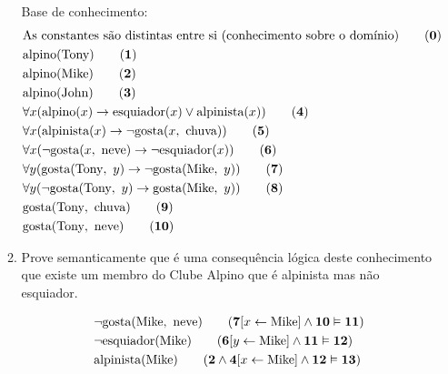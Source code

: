 \documentclass[10pt, twoside]{article}          %
\let\oldphantom\vphantom
\let\vphantom\relax
\let\vphantom\oldphantom
\renewcommand{\l}{\mathopen{}\left}             %
\renewcommand{\r}{\vphantom{1j}\right}          %
\newenvironment{proof*}[1][proof*]              %
  {\proof[#1]\vspace{0.5em}\vspace*{-\baselineskip}
  \hspace{\parindent}\leftskip=.5cm\rightskip=.5cm}
  {\vspace*{-1.5\baselineskip}
  
  \rightskip=0cm\endproof}
\begin{document}
\begin{multicols*}{2}
\begin{enumerate}
\begin{proof*}[\unskip\nopunct]
\begin{enumerate}
        Base de conhecimento:
        \begin{align*}
          & \text{As constantes são distintas entre si (conhecimento sobre o domínio)}              \tag{\textbf{0}}   \\
          & \text{alpino}(\text{Tony})                                                              \tag{\textbf{1}}   \\
          & \text{alpino}(\text{Mike})                                                              \tag{\textbf{2}}   \\
          & \text{alpino}(\text{John})                                                              \tag{\textbf{3}}   \\
          & \forall x(\text{alpino}(x)\rightarrow\text{esquiador}(x)\lor\text{alpinista}(x))        \tag{\textbf{4}}   \\
          & \forall x(\text{alpinista}(x)\rightarrow\lnot\text{gosta}(x,\ \text{chuva}))            \tag{\textbf{5}}   \\
          & \forall x(\lnot\text{gosta}(x,\ \text{neve})\rightarrow\lnot\text{esquiador}(x))        \tag{\textbf{6}}   \\
          & \forall y(\text{gosta}(\text{Tony},\ y)\rightarrow\lnot\text{gosta}(\text{Mike},\ y))   \tag{\textbf{7}}   \\
          & \forall y(\lnot\text{gosta}(\text{Tony},\ y)\rightarrow\text{gosta}(\text{Mike},\ y))   \tag{\textbf{8}}   \\
          & \text{gosta}(\text{Tony},\ \text{chuva})                                                \tag{\textbf{9}}   \\
          & \text{gosta}(\text{Tony},\ \text{neve})                                                 \tag{\textbf{10}}  \\
        \end{align*}

      \item Prove semanticamente que é uma consequência lógica deste conhecimento que existe um 
      membro do Clube Alpino que é alpinista mas não esquiador.
      
        \begin{align*}
          & \lnot\text{gosta}(\text{Mike},\ \text{neve})                                            \tag{$\textbf{7}\l[x\leftarrow\text{Mike}\r]\land\textbf{10}\vDash\textbf{11}$}                 \\
          & \lnot\text{esquiador}(\text{Mike})                                                      \tag{$\textbf{6}\l[y\leftarrow\text{Mike}\r]\land\textbf{11}\vDash\textbf{12}$}                 \\
          & \text{alpinista}(\text{Mike})                                                           \tag{$\textbf{2}\land\textbf{4}\l[x\leftarrow\text{Mike}\r]\land\textbf{12}\vDash\textbf{13}$}  \\
        \end{align*}


\end{enumerate}
\end{proof*}
\end{enumerate}
\end{multicols*}
\end{document}
